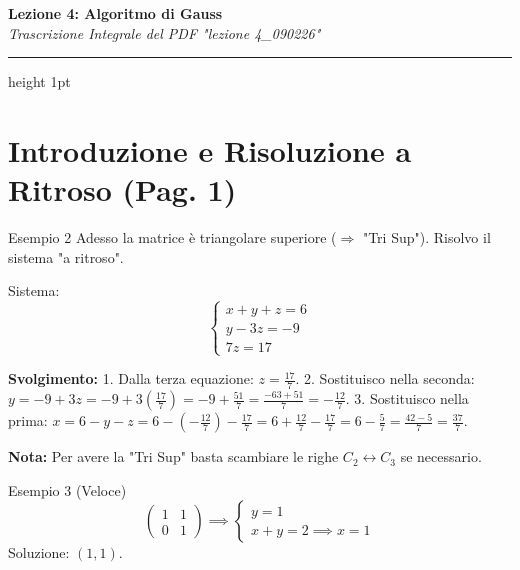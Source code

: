 \setlength{\parindent}{0pt}
\setlength{\parskip}{6pt}

\begin{center}
    {\Huge \textbf{\color{cherryRed} Lezione 4: Algoritmo di Gauss}} \\
    \vspace{0.3cm}
    {\Large \textit{Trascrizione Integrale del PDF "lezione 4\_090226"}}
    \vspace{0.5cm}
    \hrule height 1pt
\end{center}

\section{Introduzione e Risoluzione a Ritroso (Pag. 1)}

\begin{example}{Esempio 2}{}
Adesso la matrice è triangolare superiore ($\Rightarrow$ "Tri Sup"). Risolvo il sistema "a ritroso".

Sistema:
\[
\begin{cases}
x + y + z = 6 \\
y - 3z = -9 \\
7z = 17
\end{cases}
\]

\textbf{Svolgimento:}
1. Dalla terza equazione: $z = \frac{17}{7}$.
2. Sostituisco nella seconda: $y = -9 + 3z = -9 + 3\left(\frac{17}{7}\right) = -9 + \frac{51}{7} = \frac{-63+51}{7} = -\frac{12}{7}$.
3. Sostituisco nella prima: $x = 6 - y - z = 6 - \left(-\frac{12}{7}\right) - \frac{17}{7} = 6 + \frac{12}{7} - \frac{17}{7} = 6 - \frac{5}{7} = \frac{42-5}{7} = \frac{37}{7}$.

\textbf{Nota:} Per avere la "Tri Sup" basta scambiare le righe $C_2 \leftrightarrow C_3$ se necessario.
\end{example}

\begin{example}{Esempio 3 (Veloce)}{}
\[
\begin{pmatrix} 1 & 1 \\ 0 & 1 \end{pmatrix} \implies \begin{cases} y=1 \\ x+y=2 \implies x=1 \end{cases}
\]
Soluzione: $(1, 1)$.
\end{example}

